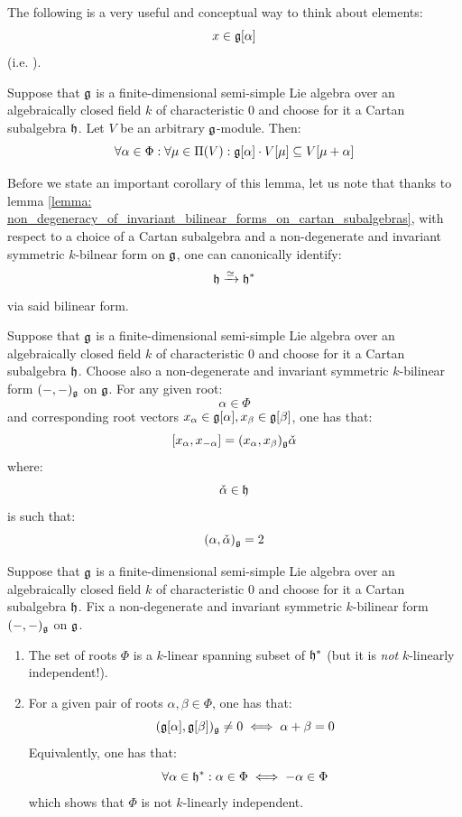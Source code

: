             The following is a very useful and conceptual way to think about elements:
                $$x \in \mathfrak{g}[\alpha]$$
            (i.e. ). 
            \begin{lemma}
                Suppose that $\mathfrak{g}$ is a finite-dimensional semi-simple Lie algebra over an algebraically closed field $k$ of characteristic $0$ and choose for it a Cartan subalgebra $\mathfrak{h}$. Let $V$ be an arbitrary $\mathfrak{g}$-module. Then:
                    $$\forall \alpha \in \Phi: \forall \mu \in \Pi(V): \mathfrak{g}[\alpha] \cdot V[\mu] \subseteq V[\mu + \alpha]$$
            \end{lemma}
            Before we state an important corollary of this lemma, let us note that thanks to lemma \ref{lemma: non_degeneracy_of_invariant_bilinear_forms_on_cartan_subalgebras}, with respect to a choice of a Cartan subalgebra and a non-degenerate and invariant symmetric $k$-bilnear form on $\mathfrak{g}$, one can canonically identify:
                $$\mathfrak{h} \xrightarrow[]{\simeq} \mathfrak{h}^*$$
            via said bilinear form. 
            \begin{corollary}
                Suppose that $\mathfrak{g}$ is a finite-dimensional semi-simple Lie algebra over an algebraically closed field $k$ of characteristic $0$ and choose for it a Cartan subalgebra $\mathfrak{h}$. Choose also a non-degenerate and invariant symmetric $k$-bilinear form $(-, -)_{\mathfrak{g}}$ on $\mathfrak{g}$. For any given root:
                    $$\alpha \in \Phi$$
                and corresponding root vectors $x_{\alpha} \in \mathfrak{g}[\alpha], x_{\beta} \in \mathfrak{g}[\beta]$, one has that:
                    $$[x_{\alpha}, x_{-\alpha}] = (x_{\alpha}, x_{\beta})_{\mathfrak{g}} \check{\alpha}$$
                where:
                    $$\check{\alpha} \in \mathfrak{h}$$
                is such that:
                    $$(\alpha, \check{\alpha})_{\mathfrak{g}} = 2$$
            \end{corollary}
            \begin{proposition}
                Suppose that $\mathfrak{g}$ is a finite-dimensional semi-simple Lie algebra over an algebraically closed field $k$ of characteristic $0$ and choose for it a Cartan subalgebra $\mathfrak{h}$. Fix a non-degenerate and invariant symmetric $k$-bilinear form $(-, -)_{\mathfrak{g}}$ on $\mathfrak{g}$.
                \begin{enumerate}
                    \item The set of roots $\Phi$ is a $k$-linear spanning subset of $\mathfrak{h}^*$ (but it is \textit{not} $k$-linearly independent!).
                    \item For a given pair of roots $\alpha, \beta \in \Phi$, one has that:
                        $$(\mathfrak{g}[\alpha], \mathfrak{g}[\beta])_{\mathfrak{g}} \not = 0 \iff \alpha + \beta = 0$$
                    Equivalently, one has that:
                        $$\forall \alpha \in \mathfrak{h}^*: \alpha \in \Phi \iff -\alpha \in \Phi$$
                    which shows that $\Phi$ is not $k$-linearly independent.
                \end{enumerate}
            \end{proposition}
